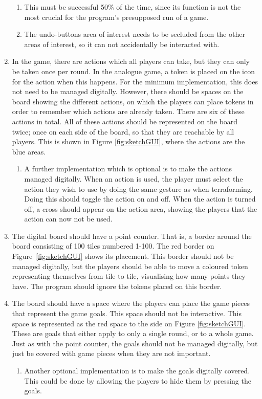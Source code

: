 \begin{enumerate}
	\begin{enumerate}
	\item This must be successful 50\% of the time, since its function is not the most crucial for the program’s presupposed run of a game.
	\item The undo-buttons area of interest needs to be secluded from the other areas of interest, so it can not accidentally be interacted with. 
	\end{enumerate}
\item In the game, there are actions which all players can take, but they can only be taken once per round. In the analogue game, a token is placed on the icon for the action when this happens. For the minimum implementation, this does not need to be managed digitally. However, there should be spaces on the board showing the different actions, on which the players can place tokens in order to remember which actions are already taken. There are six of these actions in total. All of these actions should be represented on the board twice; once on each side of the board, so that they are reachable by all players. This is shown in Figure \ref{fig:sketchGUI}, where the actions are the blue areas. 
	\begin{enumerate}
	\item A further implementation which is optional is to make the actions managed digitally. When an action is used, the player must select the action they wish to use by doing the same gesture as when terraforming. Doing this should toggle the action on and off. When the action is turned off, a cross should appear on the action area, showing the players that the action can now not be used.
	\end{enumerate}
\item The digital board should have a point counter. That is, a border around the board consisting of 100 tiles numbered 1-100. The red border on Figure~\ref{fig:sketchGUI} shows its placement. This border should not be managed digitally, but the players should be able to move a coloured token representing themselves from tile to tile, visualising how many points they have. The program should ignore the tokens placed on this border.
\item The board should have a space where the players can place the game pieces that represent the game goals. This space should not be interactive. This space is represented as the red space to the side on Figure \ref{fig:sketchGUI}. These are goals that either apply to only a single round, or to a whole game. Just as with the point counter, the goals should not be managed digitally, but just be covered with game pieces when they are not important.
	\begin{enumerate}
	\item Another optional implementation is to make the goals digitally covered. This could be done by allowing the players to hide them by pressing the goals.
	\end{enumerate}
\end{enumerate}
